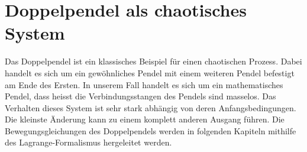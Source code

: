 
\section{Doppelpendel als chaotisches System}
Das Doppelpendel ist ein klassisches Beispiel für einen chaotischen Prozess.
Dabei handelt es sich um ein gewöhnliches Pendel mit einem weiteren Pendel
befestigt am Ende des Ersten.
In unserem Fall handelt es sich um ein mathematisches Pendel, dass heisst
die Verbindungsstangen des Pendels sind masselos.
Das Verhalten dieses System ist sehr stark abhängig von deren Anfangsbedingungen.
Die kleinste Änderung kann zu einem komplett anderen Ausgang führen.
Die Bewegungsgleichungen des Doppelpendels werden in folgenden Kapiteln
mithilfe des Lagrange-Formalismus hergeleitet werden.